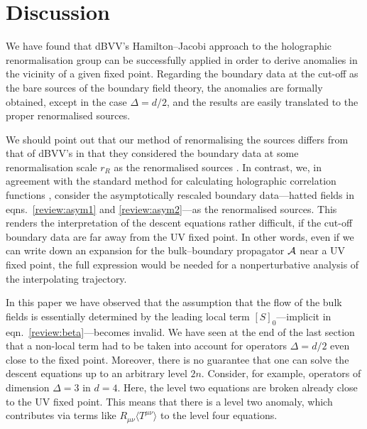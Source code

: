 \documentclass[a4paper,12pt]{article}
\begin{document}
\section{Discussion}
\label{global}
We have found that dBVV's Hamilton--Jacobi approach to
the holographic renormalisation group can be successfully applied in
order to derive anomalies in the vicinity of a
given fixed point. Regarding the boundary data at the cut-off as the
bare sources 
of the boundary field theory, the anomalies are formally obtained,
except in the case $\Delta=d/2$, and the results are easily
translated to the proper renormalised sources. 

We should 
point out that our method of renormalising the sources differs from
that of dBVV's in that they considered the boundary data at some
renormalisation scale $r_R$ as the renormalised sources \cite{deBoer00a}. 
In contrast, we, in agreement with the standard method for calculating 
holographic correlation functions 
\cite{Witten98-1,Gubser98-1,Freedman99a,Arutyunov00a}, 
consider the asymptotically rescaled boundary
data---hatted fields in eqns.\ \eqref{review:asym1} and
\eqref{review:asym2}---as the renormalised sources. This renders the
interpretation of the descent equations rather difficult, if the cut-off
boundary data are far away from the UV fixed point. In other words, even if
we can write down an expansion for the bulk--boundary propagator ${\cal A}$ near
a UV fixed point, the full expression would be needed for a nonperturbative
analysis of the interpolating trajectory.




In this paper we have observed that the assumption that the flow of 
the bulk fields is essentially determined by the leading local term
$[S]_0$---implicit in eqn.\ \eqref{review:beta}---becomes invalid. 
We have seen at the end of the last section that
a non-local term had to be taken into account for operators
$\Delta=d/2$ even close to the fixed point. Moreover, there is no guarantee
that one can solve the descent equations up to an arbitrary level
$2n$. Consider, for example, operators of dimension $\Delta=3$ in $d=4$. 
Here, the level
two equations are broken already close to the UV fixed point. This
means that there is a level two anomaly, which contributes via terms
like $R_{\mu\nu} \langle T^{\mu\nu} \rangle$ to the level four
equations.  
\end{document}
